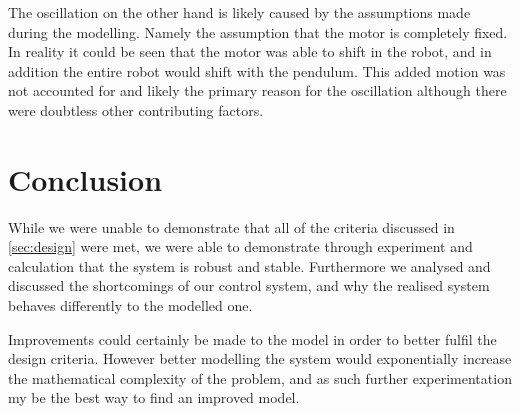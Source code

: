 \documentclass[11pt, a4paper,twocolumn ]{article}
\begin{document}
The oscillation on the other hand is likely caused by the assumptions made during the modelling. Namely the assumption that the motor is completely fixed. In reality it could be seen that the motor was able to shift in the robot, and in addition the entire robot would shift with the pendulum. This added motion was not accounted for and likely the primary reason for the oscillation although there were doubtless other contributing factors.

    \section{Conclusion}\label{sec:con}

While we were unable to demonstrate that all of the criteria discussed in \ref{sec:design} were met, we were able to demonstrate through experiment and calculation that the system is robust and stable. Furthermore we analysed and discussed the shortcomings of our control system, and why the realised system behaves differently to the modelled one.

Improvements could certainly be made to the model in order to better fulfil the design criteria. However better modelling the system would exponentially increase the mathematical complexity of the problem, and as such further experimentation my be the best way to find an improved model.
\end{document}
